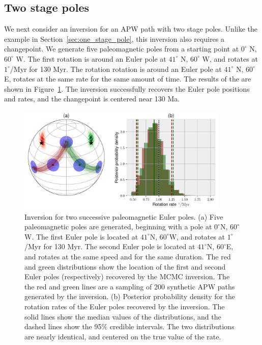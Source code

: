 \documentclass[preprint,12pt,authoryear]{elsarticle}
\begin{document}
\subsection{Two stage poles}
\label{sec:two_stage_poles}
We next consider an inversion for an APW path with two stage poles.
Unlike the example in Section~\ref{sec:one_stage_pole}, this inversion also requires a changepoint.
We generate five paleomagnetic poles from a starting point at $0^\circ$ N, $60^\circ$ W.
The first rotation is around an Euler pole at $41^\circ$ N, $60^\circ$ W, and rotates at $1^\circ$/Myr for 130 Myr.
The rotation rotation is around an Euler pole at $41^\circ$ N, $60^\circ$ E, rotates at the same rate for the same amount of time.
The results of the are shown in Figure~\ref{fig:two_euler_poles}.
The inversion successfully recovers the Euler pole positions and rates, and the changepoint is centered near 130 Ma.
\begin{figure}
\includegraphics[width=0.9\textwidth]{figures/synthetic/two_euler_poles.pdf}
\caption[Inversion for two successive paleomagnetic Euler poles.]{Inversion for two successive paleomagnetic Euler poles. (a) Five paleomagnetic poles are generated, beginning with a pole at $0^\circ$N, $60^\circ$W. The first Euler pole is located at $41^\circ$N, $60^\circ$W, and rotates at $1^\circ$/Myr for 130 Myr. The second Euler pole is located at $41^\circ$N, $60^\circ$E, and rotates at the same speed and for the same duration. The red and green distributions show the location of the first and second Euler poles (respectively) recovered by the MCMC inversion. The the red and green lines are a sampling of 200 synthetic APW paths generated by the inversion. (b) Posterior probability density for the rotation rates of the Euler poles recovered by the inversion. The solid lines show the median values of the distributions, and the dashed lines show the 95\% credible intervals. The two distributions are nearly identical, and centered on the true value of the rate.}
\label{fig:two_euler_poles}
\end{figure}
\end{document}
